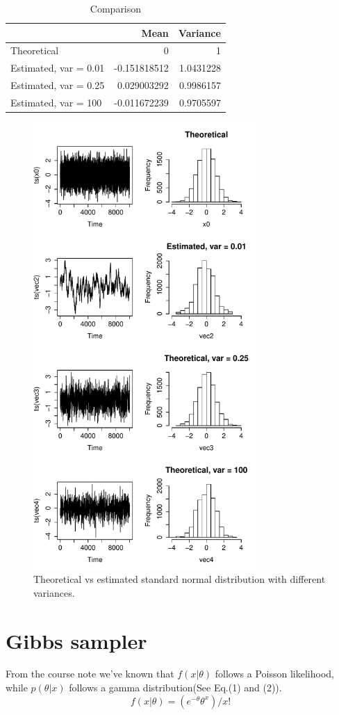 \documentclass[10pt, letterpaper]{proc}
\begin{document}
\begin{table}[h]
	\centering
	\caption{Comparison}
	\begin{tabular}{lrr}
		\hline  & Mean & Variance \\ 
		\hline Theoretical & 0 & 1\\ 
		 Estimated, var = 0.01 & -0.151818512& 1.0431228 \\ 
		 Estimated, var = 0.25 & 0.029003292& 0.9986157 \\ 
		 Estimated, var = 100 & -0.011672239& 0.9705597 \\ 
		\hline 
	\end{tabular} 
\end{table}
             
\begin{figure}
	\centering \includegraphics[width = 8.5cm]{1b}
	\caption{Theoretical vs estimated standard normal distribution with different variances.}
\end{figure}

\section{Gibbs sampler}
From the course note we've known that $f(x|\theta)$ follows a Poisson likelihood, while $p(\theta|x)$ follows a gamma distribution(See Eq.(1) and (2)). 
\begin{equation}
f(x|\theta)= (e^{-\theta}\theta^x)/x! 
\end{equation}
\end{document}
